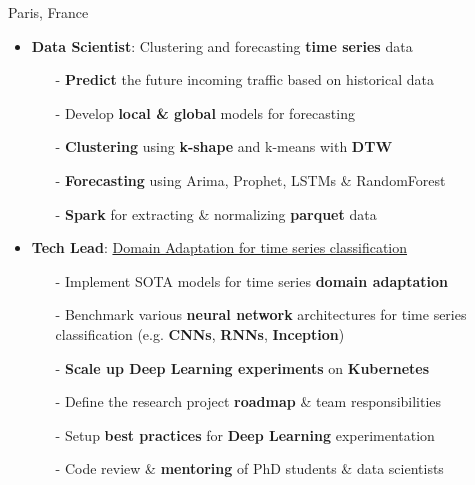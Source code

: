 \documentclass[10pt,a4paper,ragged2e]{altacv}
\begin{document}
\divider 

     {Paris, France}
\begin{itemize}
	
	\item \textbf{Data Scientist}: Clustering and forecasting \textbf{time series} data
	\vspace{0.3em}
	\begin{itemize}
		\item[-] \textbf{Predict} the future incoming traffic based on historical data
		\item[-] Develop \textbf{local \& global} models for forecasting 
		\item[-] \textbf{Clustering} using \textbf{k-shape} and k-means with \textbf{DTW} 
		\item[-] \textbf{Forecasting} using Arima, Prophet, LSTMs \& RandomForest 
		\item[-] \textbf{Spark} for extracting \& normalizing \textbf{parquet} data 
	\end{itemize}

	\item \textbf{Tech Lead}: \href{https://github.com/EricssonResearch/UDA-4-TSC}{Domain Adaptation for time series classification}
	\vspace{0.3em}
	\begin{itemize}
		\item[-] Implement SOTA models for time series \textbf{domain adaptation}
		\item[-] Benchmark various \textbf{neural network} architectures for time series classification (e.g. \textbf{CNNs}, \textbf{RNNs}, \textbf{Inception})
		\item[-] \textbf{Scale up Deep Learning experiments} on \textbf{Kubernetes}
		\item[-] Define the research project \textbf{roadmap} \& team responsibilities
		\item[-] Setup \textbf{best practices} for \textbf{Deep Learning} experimentation
		\item[-] Code review \& \textbf{mentoring} of PhD students \& data scientists
	\end{itemize}



\end{itemize}
\end{document}
